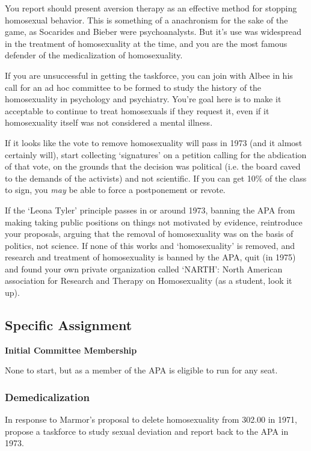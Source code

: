 \begin{refsection}
You report should present aversion therapy as an effective method for stopping homosexual behavior. This is something of a anachronism for the sake of the game, as Socarides and Bieber were psychoanalysts. But it's use was widespread in the treatment of homosexuality at the time, and you are the most famous defender of the medicalization of homosexuality.

If you are unsuccessful in getting the taskforce, you can join with Albee in his call for an ad hoc committee to be formed to study the history of the homosexuality in psychology and psychiatry. You're goal here is to make it acceptable to continue to treat homosexuals if they request it, even if it homosexuality itself was not considered a mental illness.

If it looks like the vote to remove homosexuality will pass in 1973 (and it almost certainly will), start collecting `signatures' on a petition calling for the abdication of that vote, on the grounds that the decision was political (i.e. the board caved to the demands of the activists) and not scientific. If you can get 10\% of the class to sign, you \emph{may} be able to force a postponement or revote.

If the `Leona Tyler' principle passes in or around 1973, banning the APA from making taking public positions on things not motivated by evidence, reintroduce your proposals, arguing that the removal of homosexuality was on the basis of politics, not science. If none of this works and `homosexuality' is removed, and research and treatment of homosexuality is banned by the APA, quit (in 1975) and found your own private organization called `NARTH': North American association for Research and Therapy on Homosexuality (as a student, look it up).

\subsection{Specific Assignment}
\label{specificassignment}

\textbf{Initial Committee Membership}

None to start, but as a member of the APA is eligible to run for any seat.

\subsubsection{Demedicalization}
\label{demedicalization}

\begin{proposal}[Socarides]\label{proposal:socarides}In response to Marmor's proposal to delete homosexuality from 302.00 in 1971, propose a taskforce to study sexual deviation and report back to the APA in 1973.\end{proposal}


\end{refsection}
